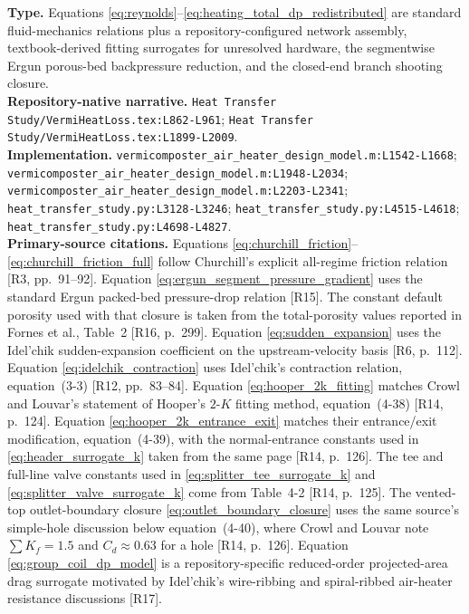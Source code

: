 \documentclass[11pt]{article}
\newcommand{\srcref}[1]{\nolinkurl{#1}}
\newcommand{\filepath}[1]{\nolinkurl{#1}}
\begin{document}
\textbf{Type.} Equations \eqref{eq:reynolds}--\eqref{eq:heating_total_dp_redistributed} are standard fluid-mechanics relations plus a repository-configured network assembly, textbook-derived fitting surrogates for unresolved hardware, the segmentwise Ergun porous-bed backpressure reduction, and the closed-end branch shooting closure. \\
\textbf{Repository-native narrative.} \filepath{Heat Transfer Study/VermiHeatLoss.tex:L862-L961}; \filepath{Heat Transfer Study/VermiHeatLoss.tex:L1899-L2009}. \\
\textbf{Implementation.} \srcref{vermicomposter_air_heater_design_model.m:L1542-L1668}; \srcref{vermicomposter_air_heater_design_model.m:L1948-L2034}; \srcref{vermicomposter_air_heater_design_model.m:L2203-L2341}; \srcref{heat_transfer_study.py:L3128-L3246}; \srcref{heat_transfer_study.py:L4515-L4618}; \srcref{heat_transfer_study.py:L4698-L4827}. \\
\textbf{Primary-source citations.} Equations \eqref{eq:churchill_friction}--\eqref{eq:churchill_friction_full} follow Churchill's explicit all-regime friction relation [R3, pp.~91--92]. Equation \eqref{eq:ergun_segment_pressure_gradient} uses the standard Ergun packed-bed pressure-drop relation [R15]. The constant default porosity used with that closure is taken from the total-porosity values reported in Fornes et al., Table~2 [R16, p.~299]. Equation \eqref{eq:sudden_expansion} uses the Idel'chik sudden-expansion coefficient on the upstream-velocity basis [R6, p.~112]. Equation \eqref{eq:idelchik_contraction} uses Idel'chik's contraction relation, equation~(3-3) [R12, pp.~83--84]. Equation \eqref{eq:hooper_2k_fitting} matches Crowl and Louvar's statement of Hooper's \(2\)-\(K\) fitting method, equation~(4-38) [R14, p.~124]. Equation \eqref{eq:hooper_2k_entrance_exit} matches their entrance/exit modification, equation~(4-39), with the normal-entrance constants used in \eqref{eq:header_surrogate_k} taken from the same page [R14, p.~126]. The tee and full-line valve constants used in \eqref{eq:splitter_tee_surrogate_k} and \eqref{eq:splitter_valve_surrogate_k} come from Table~4-2 [R14, p.~125]. The vented-top outlet-boundary closure \eqref{eq:outlet_boundary_closure} uses the same source's simple-hole discussion below equation~(4-40), where Crowl and Louvar note \(\sum K_f=1.5\) and \(C_d\approx0.63\) for a hole [R14, p.~126]. Equation \eqref{eq:group_coil_dp_model} is a repository-specific reduced-order projected-area drag surrogate motivated by Idel'chik's wire-ribbing and spiral-ribbed air-heater resistance discussions [R17]. \\
\end{document}
